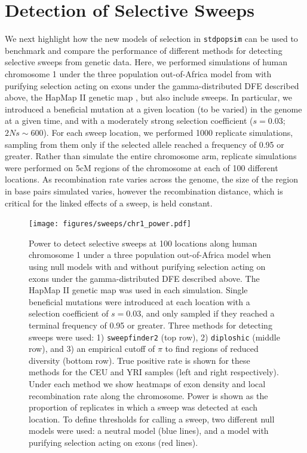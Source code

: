 \documentclass[hidelinks]{article}
\newcommand{\stdpopsim}{\texttt{stdpopsim}\xspace}
\newcommand{\sweepfinder}{\texttt{sweepfinder2}\xspace}
\newcommand{\diploshic}{\texttt{diploshic}\xspace}
\begin{document}
\section*{Detection of Selective Sweeps}
    \label{sweeps}
    We next highlight how the new models of selection in \stdpopsim can be used to benchmark and compare the performance of different methods for detecting selective sweeps from genetic data.
    Here, we performed simulations of human chromosome 1 under the three population out-of-Africa model from \cite{gutenkunst2009inferring} with purifying selection acting on exons under the gamma-distributed DFE described above, the HapMap II genetic map \citep{international2007second}, but also include sweeps.
    In particular, we introduced a beneficial mutation at a given location (to be varied) in the genome at a given time, and with a moderately strong selection coefficient ($s = 0.03$; $2Ns \sim 600$).
    For each sweep location, we performed 1000 replicate simulations, sampling from them only if the selected allele reached a frequency of 0.95 or greater.
    Rather than simulate the entire chromosome arm, replicate simulations were performed on 5cM regions of the chromosome at each of 100 different locations.
    As recombination rate varies across the genome, the size of the region in base pairs simulated varies, however the recombination distance, which is critical for the linked effects of a sweep, is held constant.
 

    \begin{figure}
        \centering
        \texttt{[image: figures/sweeps/chr1\_power.pdf]}
        \caption{
        Power to detect selective sweeps at 100 locations along human
        chromosome 1 under a three population out-of-Africa model
        \citep{gutenkunst2009inferring} when using null models with and without
        purifying selection acting on exons under the gamma-distributed DFE
        described above.  The HapMap II genetic map
        \citep{international2007second} was used in each simulation.  Single
        beneficial mutations were introduced at each location with a selection
        coefficient of $s = 0.03$, and only sampled if they reached a terminal
        frequency of 0.95 or greater.  Three methods for detecting sweeps were
        used: 1) \sweepfinder \citep{degiorgio2016sweepfinder2} (top row), 2)
        \diploshic \citep{kern2018diplos} (middle row), and 3) an empirical
        cutoff of $\pi$ to find regions of reduced diversity (bottom row).
        True positive rate is shown for these methods for the CEU and YRI
        samples (left and right respectively).  Under each method we show
        heatmaps of exon density and local recombination rate along the
        chromosome.  Power is shown as the proportion of replicates in which a
        sweep was detected at each location.  To define
        thresholds for calling a sweep, two different null models were used: a
        neutral model (blue lines), and a model with purifying selection acting
        on exons (red lines).
        }
        \label{fig:chr1_power}
    \end{figure}
    
\end{document}

